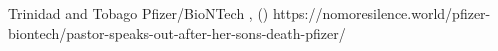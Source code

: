           {Trinidad and Tobago}
          {}
          {Pfizer/BioNTech}
          {}
          {
            ,
             ()
          }
          {https://nomoresilence.world/pfizer-biontech/pastor-speaks-out-after-her-sons-death-pfizer/}

